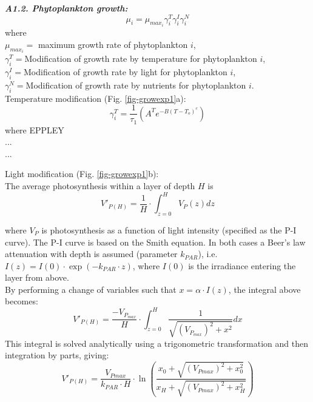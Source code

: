 \documentclass[11pt,letterpaper,english]{article}
\begin{document}
{\it {\bf A1.2. Phytoplankton growth:}}\\
\[ 
\mu_i = \mu_{max_{i}} \gamma_i^T \gamma_i^I \gamma_i^N
\]
where\\
\mbox{} \hspace{.5cm} $\mu_{max_{i}}=$ maximum growth rate of phytoplankton $i$,\\
\mbox{} \hspace{.5cm} $\gamma_i^T=$Modification of growth rate by
temperature for phytoplankton $i$,\\
\mbox{} \hspace{.5cm} $\gamma_i^I=$Modification of growth rate by light for
phytoplankton $i$,\\
\mbox{} \hspace{.5cm} $\gamma_i^N=$Modification of growth rate by nutrients
for phytoplankton $i$.\\

Temperature modification (Fig. \ref{fig-growexp1}a):\\
\[
\gamma_i^T= \frac{1}{\tau_1} (A^T e^{-B(T-T_o)^c})
\]
where EPPLEY \\
... \\
...  

Light modification (Fig. \ref{fig-growexp1}b):\\

The average photosynthesis within a layer of depth $H$ is
\[
V'_{P(H)} = \frac{1}{H} \cdot \int_{z = 0}^{H}V_P(z)dz
\]

where $V_P$ is photosynthesis as a function of light intensity (specified as the P-I curve). The P-I curve is based on the Smith equation. In both cases a Beer's law attenuation with depth is assumed (parameter $k_{PAR}$), i.e. $I(z) = I(0) \cdot \exp(-k_{PAR} \cdot z)$, where $I(0)$ is the irradiance entering the layer from above. \\
By performing a change of variables such that $x = \alpha \cdot I(z)$, the integral above becomes:
\[
V'_{P(H)} = \frac{-V_{P_{max}}}{H} \cdot \int_{z = 0}^{H}\frac{1}{\sqrt{(V_{P_{max}})^2 + x^2}}dx
\]
This integral is solved analytically using a trigonometric transformation and then integration by parts, giving:
\begin{equation}
V'_{P(H)} = \frac{V_{Pmax}}{k_{PAR} \cdot H} \cdot \ln \left(\frac{x_0 + \sqrt{(V_{Pmax})^2+ x_0^2}}{x_H + \sqrt{(V_{Pmax})^2+ x_H^2}}\right)
\end{equation} 

\\
\end{document}
